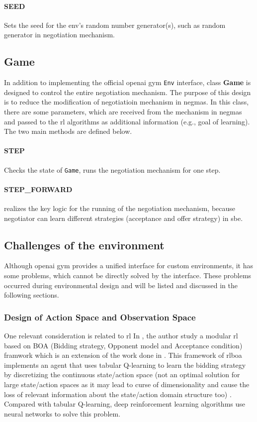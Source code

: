 \paragraph{SEED} Sets the seed for the env's random number generator(s), such as random generator in negotiation mechanism.

\subsection{Game} \label{game}
In addition to implementing the official \gls{openai gym} \texttt{Env} interface, class \textbf{Game} is designed to control the entire negotiation mechanism. The purpose of this design is to reduce the modification of negotiatioin mechanism in \gls{negmas}. In this class, there are some parameters, which are received from the mechanism in \gls{negmas} and passed to the \gls{rl} algorithms as additional information (e.g., goal of learning). The two main methods are defined below.
 
\paragraph{STEP} Checks the state of \texttt{Game}, runs the negotiation mechanism for one step.
\paragraph{STEP\_FORWARD} realizes the key logic for the running of the negotiation mechanism, because negotiator can learn different strategies (acceptance and offer strategy) in \gls{sbe}. 

\subsection{Challenges of the environment}
Although \gls{openai gym} provides a unified interface for custom environments, it has some problems, which cannot be directly solved by the interface. These problems occurred during environmental design and will be listed and discussed in the following sections. 

\subsubsection{Design of Action Space and Observation Space}
One relevant consideration is related to \gls{rl} In \parencite{Bakker2019RLBOAAM}, the author study a modular \gls{rl} based on BOA (Bidding strategy, Opponent model and Acceptance condition) framwork which is an extension of the work done in \parencite{Bakker2019RLBOAAM}. This framework of \gls{rlboa} implements an agent that uses tabular Q-learning to learn the bidding strategy by discretizing the continuous state/action space (not an optimal solution for large state/action spaces as it may lead to curse of dimensionality and cause the loss of relevant information about the state/action domain structure too) \parencite{bagga2020deep}. 
Compared with tabular Q-learning, deep reinforcement learning algorithms use neural networks to solve this problem.
 
